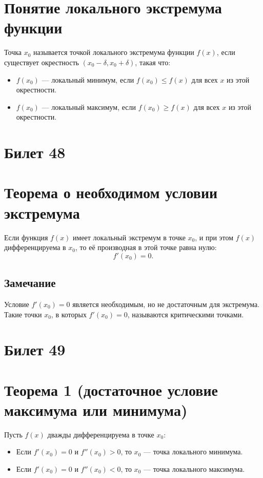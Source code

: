 \documentclass{article}
\begin{document}
\section*{Понятие локального экстремума функции}
Точка \( x_0 \) называется точкой локального экстремума функции \( f(x) \), если существует окрестность \( (x_0 - \delta, x_0 + \delta) \), такая что:
\begin{itemize}
    \item \( f(x_0) \) — локальный минимум, если \( f(x_0) \leq f(x) \) для всех \( x \) из этой окрестности.
    \item \( f(x_0) \) — локальный максимум, если \( f(x_0) \geq f(x) \) для всех \( x \) из этой окрестности.
\end{itemize}

\section{Билет 48}

\section*{Теорема о необходимом условии экстремума}
Если функция \( f(x) \) имеет локальный экстремум в точке \( x_0 \), и при этом \( f(x) \) дифференцируема в \( x_0 \), то её производная в этой точке равна нулю:
\[
f'(x_0) = 0.
\]

\subsection*{Замечание}
Условие \( f'(x_0) = 0 \) является необходимым, но не достаточным для экстремума. Такие точки \( x_0 \), в которых \( f'(x_0) = 0 \), называются критическими точками.


\section{Билет 49}

\section*{Теорема 1 (достаточное условие максимума или минимума)}
Пусть \( f(x) \) дважды дифференцируема в точке \( x_0 \):
\begin{itemize}
    \item Если \( f'(x_0) = 0 \) и \( f''(x_0) > 0 \), то \( x_0 \) — точка локального минимума.
    \item Если \( f'(x_0) = 0 \) и \( f''(x_0) < 0 \), то \( x_0 \) — точка локального максимума.
\end{itemize}
\end{document}
